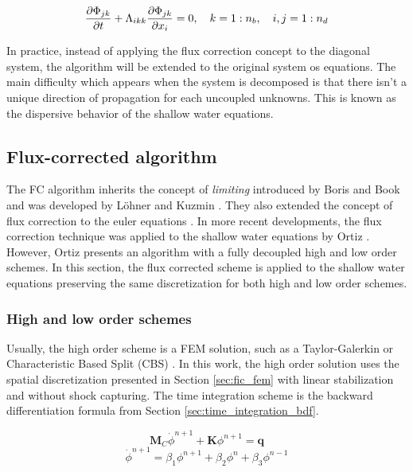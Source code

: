 \begin{equation}
\frac{\partial\Phi_{jk}}{\partial t} + \Lambda_{ikk} \frac{\partial\Phi_{jk}}{\partial x_i} = 0 , \quad
k = 1:n_b , \quad
i,j = 1:n_d
\end{equation}

In practice, instead of applying the flux correction concept to the diagonal system, the algorithm will be extended to the original system os equations. The main difficulty which appears when the system is decomposed is that there isn't a unique direction of propagation for each uncoupled unknowns. This is known as the dispersive behavior of the shallow water equations.



\subsection{Flux-corrected algorithm}

The FC algorithm inherits the concept of \emph{limiting} introduced by Boris and Book \cite{boris1973} and was developed by Löhner \cite{lohner2008ch9} and Kuzmin \cite{kuzmin2001}. They also extended the concept of flux correction to the euler equations \cite{lohner2008ch9, kuzmin2005b}. In more recent developments, the flux correction technique was applied to the shallow water equations by Ortiz \cite{ortiz2012}. However, Ortiz presents an algorithm with a fully decoupled high and low order schemes. In this section, the flux corrected scheme is applied to the shallow water equations preserving the same discretization for both high and low order schemes. 



\subsubsection{High and low order schemes}

Usually, the high order scheme is a FEM solution, such as a Taylor-Galerkin \cite{lohner2008ch6} or Characteristic Based Split (CBS) \cite{ortiz2012}.
In this work, the high order solution uses the spatial discretization presented in Section \ref{sec:fic_fem} with linear stabilization and without shock capturing. The time integration scheme is the backward differentiation formula from Section \ref{sec:time_integration_bdf}.

\begin{equation} \label{ho}
\mathbf{M}_C\dot{\phi}^{n+1} + \mathbf{K}\phi^{n+1} = \mathbf{q}
\end{equation}
\begin{equation} \label{bdf}
\dot{\phi}^{n+1} = \beta_1\phi^{n+1} + \beta_2\phi^{n} + \beta_3\phi^{n-1}
\end{equation}

